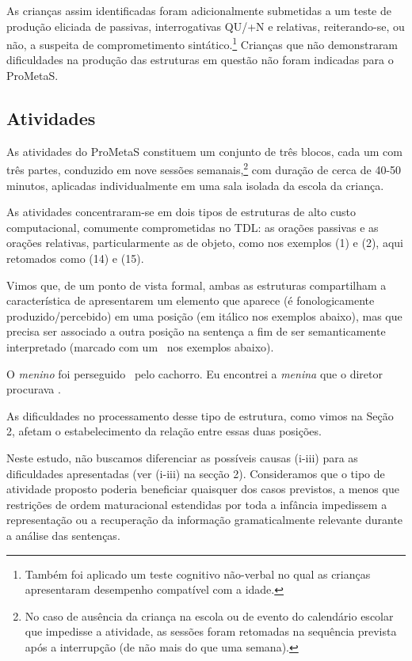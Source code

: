 \documentclass[output=paper,colorlinks,citecolor=brown,booklanguage=portuguese]{langscibook}
\begin{document}
As crianças assim identificadas foram adicionalmente submetidas a um teste de produção eliciada de passivas, interrogativas QU/+N e relativas, reiterando-se, ou não, a suspeita de comprometimento sintático.\footnote{Também foi aplicado um teste cognitivo não-verbal \citep{Oliveira2000} no qual as crianças apresentaram desempenho compatível com a idade.} Crianças que não demonstraram dificuldades na produção das estruturas em questão não foram indicadas para o ProMetaS.

\subsection{Atividades}
As atividades do ProMetaS constituem um conjunto de três blocos, cada um com três partes, conduzido em nove sessões semanais,\footnote{No caso de ausência da criança na escola ou de evento do calendário escolar que impedisse a atividade, as sessões foram retomadas na sequência prevista após a interrupção (de não mais do que uma semana).} com duração de cerca de 40-50 minutos, aplicadas individualmente em uma sala isolada da escola da criança. 

As atividades concentraram-se em dois tipos de estruturas de alto custo computacional, comumente comprometidas no TDL: as orações passivas e as orações relativas, particularmente as de objeto, como nos exemplos (1) e (2), aqui retomados como (14) e (15). 

Vimos que, de um ponto de vista formal, ambas as estruturas compartilham a característica de apresentarem um elemento que aparece (é fonologicamente produzido/percebido) em uma posição (em itálico nos exemplos abaixo), mas que precisa ser associado a outra posição na sentença a fim de ser semanticamente interpretado (marcado com um \longrule ~nos exemplos abaixo).


\ea\label{ex:14:14}	O \emph{menino} foi perseguido \longrule ~pelo cachorro.
\z
\ea\label{ex:14:15}	Eu encontrei a \emph{menina} que o diretor procurava \longrule.
\z

As dificuldades no processamento desse tipo de estrutura, como vimos na Seção 2, afetam o estabelecimento da relação entre essas duas posições.

Neste estudo, não buscamos diferenciar as possíveis causas (i-iii) para as dificuldades apresentadas (ver (i-iii) na secção 2). Consideramos que o tipo de atividade proposto poderia beneficiar quaisquer dos casos previstos, a menos que restrições de ordem maturacional estendidas por toda a infância impedissem a representação ou a recuperação da informação gramaticalmente relevante durante a análise das sentenças. 
\end{document}
